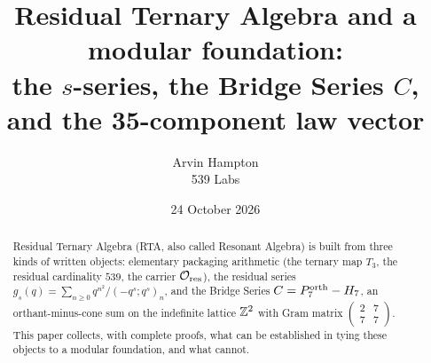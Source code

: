 \title{Residual Ternary Algebra and a modular foundation:\\ the $s$-series, the Bridge Series $C$, and the 35-component law vector}
\author{Arvin Hampton\\ \small 539 Labs}
\date{24 October 2026}

\maketitle
\begin{abstract}
Residual Ternary Algebra (RTA, also called Resonant Algebra) is built from three kinds of written objects: elementary packaging arithmetic
(the ternary map $T_3$, the residual cardinality $539$, the carrier $\mathcal O_{\rm res}$), the residual series
$g_s(q)=\sum_{n\ge0}q^{n^2}/(-q^s;q^s)_n$, and the Bridge Series $C=P^{\mathrm{orth}}_7-H_7$, an orthant-minus-cone sum on the indefinite lattice
$\mathbb{Z}^2$ with Gram matrix $\left(\begin{smallmatrix}2&7\\7&7\end{smallmatrix}\right)$. This paper collects, with complete proofs, what can be
established in tying these objects to a modular foundation, and what cannot.


\end{abstract}
